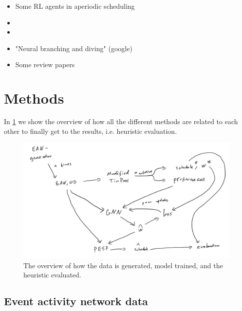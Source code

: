 \documentclass[english, 12pt, a4paper, sci, utf8, a-2b, online]{aaltothesis}
\newtheorem{definition}{Definition}
\begin{document}
\begin{itemize}
    \item Some RL agents in aperiodic scheduling
    \item 
    \item 
\end{itemize}

\begin{itemize}
    \item "Neural branching and diving" (google)
    \item Some review papers
\end{itemize}

\clearpage
\section{Methods}
In \cref{fig:process-flow} we show the overview of how all the different methods are related to each other to finally get to the results, i.e. heuristic evaluation.
\begin{figure}
    \centering
    \includegraphics[width=\textwidth]{figures/process-flow.png}
    \caption{The overview of how the data is generated, model trained, and the heuristic evaluated.}
    \label{fig:process-flow}
\end{figure}
\subsection{Event activity network data}
\label{sec:ean-def}


\end{document}
